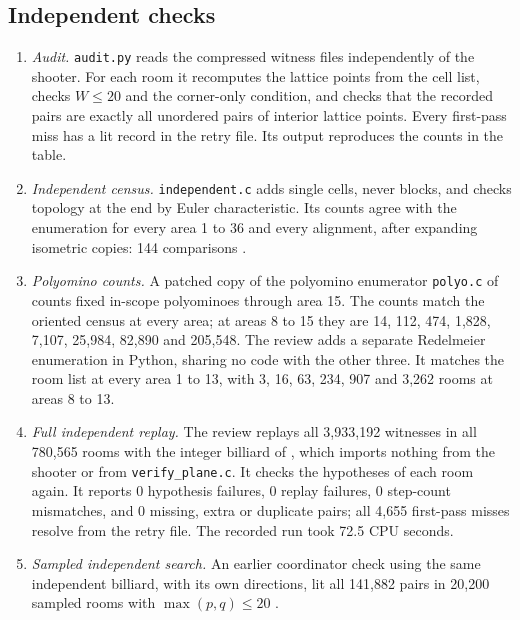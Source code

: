 \documentclass[11pt]{article}
\theoremstyle{definition}
\theoremstyle{remark}
\begin{document}
\subsection{Independent checks}\label{sec:checks}
\begin{enumerate}
\item \emph{Audit.} \texttt{audit.py} \cite{qreadme} reads the compressed
witness files independently of the shooter. For each room it recomputes
the lattice points from the cell list, checks $W\le20$ and the corner-only
condition, and checks that the recorded pairs are exactly all unordered
pairs of interior lattice points. Every first-pass miss has a lit record in
the retry file. Its output reproduces the counts in the table.
\item \emph{Independent census.} \texttt{independent.c} adds single cells,
never blocks, and checks topology at the end by Euler characteristic. Its
counts agree with the enumeration for every area 1 to 36 and every
alignment, after expanding isometric copies: 144 comparisons
\cite{qreadme}.
\item \emph{Polyomino counts.} A patched copy of the polyomino enumerator
\texttt{polyo.c} of \cite{d67} counts fixed in-scope polyominoes through
area 15. The counts match the oriented census at every area; at areas 8 to
15 they are 14, 112, 474, 1{,}828, 7{,}107, 25{,}984, 82{,}890 and
205{,}548. The review \cite{d102} adds a separate Redelmeier enumeration in
Python, sharing no code with the other three. It matches the room list at
every area 1 to 13, with 3, 16, 63, 234, 907 and 3{,}262 rooms at areas 8
to 13.
\item \emph{Full independent replay.} The review \cite[\S2]{d102} replays
all 3{,}933{,}192 witnesses in all 780{,}565 rooms with the integer
billiard of \cite{d67}, which imports nothing from the shooter or from
\texttt{verify\_plane.c}. It checks the hypotheses of each room again. It
reports 0 hypothesis failures, 0 replay failures, 0 step-count mismatches,
and 0 missing, extra or duplicate pairs; all 4{,}655 first-pass misses
resolve from the retry file. The recorded run took 72.5 CPU seconds.
\item \emph{Sampled independent search.} An earlier coordinator check
using the same independent billiard, with its own directions, lit all
141{,}882 pairs in 20{,}200 sampled rooms with $\max(p,q)\le20$
\cite[\S11]{results}.
\end{enumerate}
\end{document}
